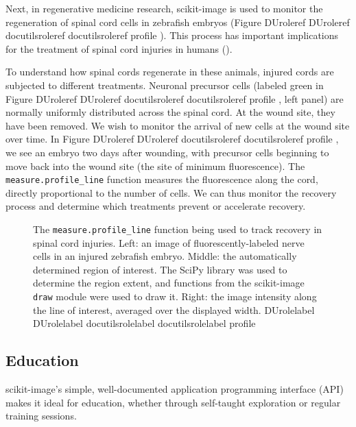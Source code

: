 \documentclass[fleqn,12pt]{wlpeerj}
\providecommand*{\DUrole}[2]{%
  \ifcsname DUrole#1\endcsname%
    \csname DUrole#1\endcsname{#2}%
  \else%
    \ifcsname docutilsrole#1\endcsname%
      \csname docutilsrole#1\endcsname{#2}%
    \else%
      #2%
    \fi%
  \fi%
}
\begin{document}
Next, in regenerative medicine research, scikit-image is used to monitor the
regeneration of spinal cord cells in zebrafish embryos (Figure \DUrole{ref}{profile}).
This process has important implications for the treatment of spinal cord
injuries in humans (\cite{Bhatt04,Thuret06}).

To understand how spinal cords regenerate in these animals, injured cords are
subjected to different treatments. Neuronal precursor cells (labeled green in Figure \DUrole{ref}{profile}, left panel) are
normally uniformly distributed across the spinal cord. At the wound site, they
have been removed. We wish to monitor the arrival of new cells at the
wound site over time. In Figure \DUrole{ref}{profile}, we see an embryo two days after
wounding, with precursor cells beginning to move back into the wound site (the site of
minimum fluorescence). The \texttt{measure.profile\_line} function measures the
fluorescence along the cord, directly proportional to the number of cells. We
can thus monitor the recovery process and determine which treatments prevent or
accelerate recovery.\begin{figure}[bht]\noindent{}
\caption{The \texttt{measure.profile\_line} function being used to track recovery in spinal
cord injuries. Left: an image of fluorescently-labeled nerve cells in an
injured zebrafish embryo. Middle: the automatically determined region of
interest. The SciPy library was used to determine the region extent, and
functions from the scikit-image \texttt{draw} module were used to draw it. Right:
the image intensity along the line of interest, averaged over the displayed
width.
\DUrole{label}{profile}}
\end{figure}

\subsection*{Education}
  \label{education}

scikit-image's simple, well-documented application programming interface (API)
makes it ideal for education, whether through self-taught exploration or
regular training sessions.
\end{document}
